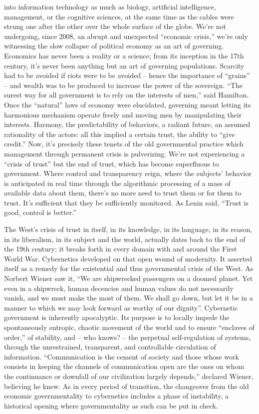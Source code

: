 \documentclass[landscape,twocolumn,letterpaper]{article}
\begin{document}
into information technology as much as biology, artificial
intelligence, management, or the cognitive sciences, at the same time
as the cables were strung one after the other over the whole surface
of the globe. We’re not undergoing, since 2008, an abrupt and
unexpected “economic crisis,” we’re only witnessing the slow collapse
of political economy as an art of governing. Economics has never been
a reality or a science; from its inception in the 17th century, it’s
never been anything but an art of governing populations. Scarcity had
to be avoided if riots were to be avoided – hence the importance of
“grains” – and wealth was to be produced to increase the power of the
sovereign. “The surest way for all government is to rely on the
interests of men,” said Hamilton. Once the “natural” laws of economy
were elucidated, governing meant letting its harmonious mechanism
operate freely and moving men by manipulating their
interests. Harmony, the predictability of behaviors, a radiant future,
an assumed rationality of the actors: all this implied a certain
trust, the ability to “give credit.”  Now, it’s precisely these tenets
of the old governmental practice which management through permanent
crisis is pulverizing. We’re not experiencing a “crisis of trust” but
the end of trust, which has become superfluous to government. Where
control and transparency reign, where the subjects’ behavior is
anticipated in real time through the algorithmic processing of a mass
of available data about them, there’s no more need to trust them or
for them to trust. It’s sufficient that they be sufficiently
monitored. As Lenin said, “Trust is good, control is better.”

The West’s crisis of trust in itself, in its knowledge, in its
language, in its reason, in its liberalism, in its subject and the
world, actually dates back to the end of the 19th century; it breaks
forth in every domain with and around the First World War. Cybernetics
developed on that open wound of modernity. It asserted itself as a
remedy for the existential and thus governmental crisis of the
West. As Norbert Wiener saw it, “We are shipwrecked passengers on a
doomed planet. Yet even in a shipwreck, human decencies and human
values do not necessarily vanish, and we must make the most of
them. We shall go down, but let it be in a manner to which we may look
forward as worthy of our dignity”. Cybernetic government is inherently
apocalyptic. Its purpose is to locally impede the spontaneously
entropic, chaotic movement of the world and to ensure “enclaves of
order,” of stability, and – who knows? – the perpetual self-regulation
of systems, through the unrestrained, transparent, and controllable
circulation of information. “Communication is the cement of society
and those whose work consists in keeping the channels of communication
open are the ones on whom the continuance or downfall of our
civilization largely depends,” declared Wiener, believing he knew. As
in every period of transition, the changeover from the old economic
governmentality to cybernetics includes a phase of instability, a
historical opening where governmentality as such can be put in check.
\end{document}
